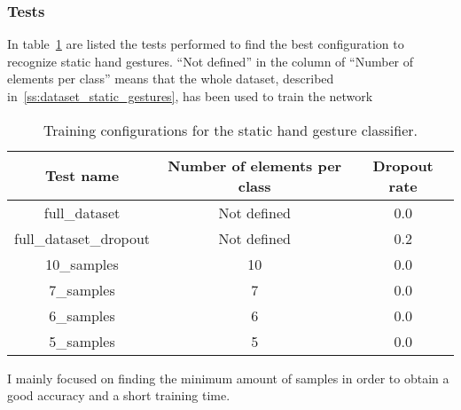 \documentclass[../thesis.tex]{subfiles}
\begin{document}
\subsubsection{Tests}
In table~\ref{tab:tests_static_hand_gestures} are listed the tests performed to find the best configuration to recognize static hand gestures. ``Not defined'' in the column of ``Number of elements per class'' means that the whole dataset, described in~\ref{ss:dataset_static_gestures}, has been used to train the network
\begin{table}[H]
\begin{tabular}{|c|c|c|}
\hline
\textbf{Test name}          & \textbf{Number of elements per class} & \textbf{Dropout rate} \\ \hline
full\_dataset               & Not defined                           & 0.0                   \\ \hline
full\_dataset\_dropout & Not defined                           & 0.2                   \\ \hline
10\_samples                 & 10                                    & 0.0                   \\ \hline
7\_samples                  & 7                                     & 0.0                   \\ \hline
6\_samples                  & 6                                     & 0.0                   \\ \hline
5\_samples                  & 5                                     & 0.0                   \\ \hline
\end{tabular}
\caption{Training configurations for the static hand gesture classifier.}\label{tab:tests_static_hand_gestures}
\end{table}
I mainly focused on finding the minimum amount of samples in order to obtain a good accuracy and a short training time. 
\end{document}
